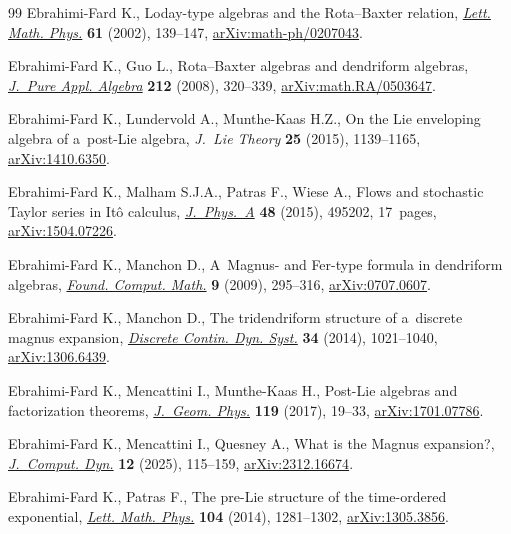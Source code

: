\documentclass[10pt,a4paper]{amsart}
\numberwithin{equation}{section}
\theoremstyle{definition}
\begin{document}
\begin{thebibliography}{99}
Ebrahimi-Fard K., Loday-type algebras and the {R}ota--{B}axter relation,
 \href{https://doi.org/10.1023/A:1020712215075}{\textit{Lett. Math. Phys.}}
 \textbf{61} (2002), 139--147,
 \href{http://arxiv.org/abs/math-ph/0207043}{arXiv:math-ph/0207043}.

Ebrahimi-Fard K., Guo L., Rota--{B}axter algebras and dendriform algebras,
 \href{https://doi.org/10.1016/j.jpaa.2007.05.025}{\textit{J.~Pure Appl.
 Algebra}} \textbf{212} (2008), 320--339,
 \href{http://arxiv.org/abs/math.RA/0503647}{arXiv:math.RA/0503647}.

Ebrahimi-Fard K., Lundervold A., Munthe-Kaas H.Z., On the {L}ie enveloping
 algebra of a~post-{L}ie algebra, \textit{J.~Lie Theory} \textbf{25} (2015),
 1139--1165, \href{http://arxiv.org/abs/1410.6350}{arXiv:1410.6350}.

Ebrahimi-Fard K., Malham S.J.A., Patras F., Wiese A., Flows and stochastic
 {T}aylor series in {I}t\^o calculus,
 \href{https://doi.org/10.1088/1751-8113/48/49/495202}{\textit{J.~Phys.~A}}
 \textbf{48} (2015), 495202, 17~pages,
 \href{http://arxiv.org/abs/1504.07226}{arXiv:1504.07226}.

Ebrahimi-Fard K., Manchon D., A~{M}agnus- and {F}er-type formula in dendriform
 algebras, \href{https://doi.org/10.1007/s10208-008-9023-3}{\textit{Found.
 Comput. Math.}} \textbf{9} (2009), 295--316,
 \href{http://arxiv.org/abs/0707.0607}{arXiv:0707.0607}.

Ebrahimi-Fard K., Manchon D., The tridendriform structure of a~discrete magnus
 expansion, \href{https://doi.org/10.3934/dcds.2014.34.1021}{\textit{Discrete
 Contin. Dyn. Syst.}} \textbf{34} (2014), 1021--1040,
 \href{http://arxiv.org/abs/1306.6439}{arXiv:1306.6439}.

Ebrahimi-Fard K., Mencattini I., Munthe-Kaas H., Post-{L}ie algebras and
 factorization theorems,
 \href{https://doi.org/10.1016/j.geomphys.2017.04.007}{\textit{J.~Geom.
 Phys.}} \textbf{119} (2017), 19--33,
 \href{http://arxiv.org/abs/1701.07786}{arXiv:1701.07786}.

Ebrahimi-Fard K., Mencattini I., Quesney A., What is the {M}agnus expansion?,
 \href{https://doi.org/10.3934/jcd.2024028}{\textit{J.~Comput. Dyn.}}
 \textbf{12} (2025), 115--159,
 \href{http://arxiv.org/abs/2312.16674}{arXiv:2312.16674}.

Ebrahimi-Fard K., Patras F., The pre-{L}ie structure of the time-ordered
 exponential, \href{https://doi.org/10.1007/s11005-014-0703-4}{\textit{Lett.
 Math. Phys.}} \textbf{104} (2014), 1281--1302,
 \href{http://arxiv.org/abs/1305.3856}{arXiv:1305.3856}.


\end{thebibliography}
\end{document}
